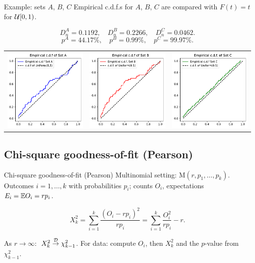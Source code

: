 \documentclass[aspectratio=169]{beamer}
\begin{document}
\begin{frame}{Example: sets $A$, $B$, $C$}
Empirical c.d.f.s for $A$, $B$, $C$
are compared with $F(t)=t$ for ${\cal U}[0,1)$.

\[
D_n^A=0.1192,\quad D_n^B=0.2266,\quad D_n^C=0.0462.
\]
\[
p^A=44.17\%,\quad p^B=0.99\%,\quad p^C=99.97\%.
\]



\begin{center}
\begin{tabular}{ccc}
\includegraphics[width=0.25\linewidth]{figures_pdf/ch2_prng_sets_A_B_C_empCDF_of_setA.pdf}
&
\includegraphics[width=0.25\linewidth]{figures_pdf/ch2_prng_sets_A_B_C_empCDF_of_setB.pdf} &
\includegraphics[width=0.25\linewidth]{figures_pdf/ch2_prng_sets_A_B_C_empCDF_of_setC.pdf}
\end{tabular}
\end{center}
\end{frame}


\subsection{Chi-square goodness-of-fit (Pearson)}
\begin{frame}{Chi-square goodness-of-fit (Pearson)}
Multinomial setting: \(\mathrm{M}(r,p_1,\ldots,p_k)\).
Outcomes \(i=1,\ldots,k\) with probabilities \(p_i\); counts \(O_i\), expectations \(E_i=\mathbb{E} O_i=rp_i\).

\[
X_k^2=\sum_{i=1}^k \frac{(O_i-rp_i)^2}{rp_i}
      =\sum_{i=1}^k \frac{O_i^2}{rp_i}-r.
\]

As \(r\to\infty\): \(\;X_k^2 \stackrel{\cal D}{\rightarrow} \chi^2_{k-1}\).
For data: compute \(O_i\), then \(X_k^2\) and the \(p\)-value from \(\chi^2_{k-1}\).
\end{frame}
\end{document}
